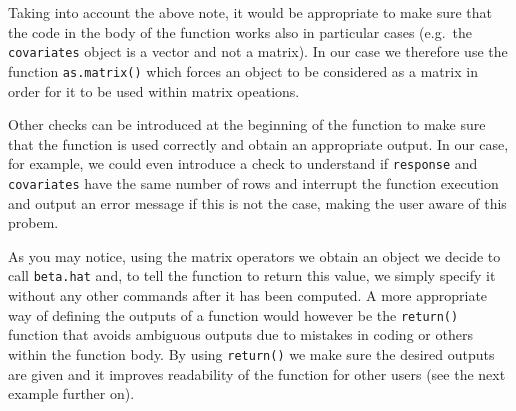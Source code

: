 \documentclass[12pt,]{krantz}
\newenvironment{Shaded}{\begin{snugshade}}{\end{snugshade}}
\newcommand{\KeywordTok}[1]{\textcolor[rgb]{0.27,0.27,0.27}{\textbf{#1}}}
\newcommand{\DecValTok}[1]{\textcolor[rgb]{0.06,0.06,0.06}{#1}}
\newcommand{\StringTok}[1]{\textcolor[rgb]{0.5,0.5,0.5}{#1}}
\newcommand{\CommentTok}[1]{\textcolor[rgb]{0.37,0.37,0.37}{\textit{#1}}}
\newcommand{\ControlFlowTok}[1]{\textcolor[rgb]{0.27,0.27,0.27}{\textbf{#1}}}
\newcommand{\OperatorTok}[1]{\textcolor[rgb]{0.43,0.43,0.43}{\textbf{#1}}}
\newcommand{\NormalTok}[1]{#1}
\let\BeginKnitrBlock\begin \let\EndKnitrBlock\end
\begin{document}
Taking into account the above note, it would be appropriate to make sure
that the code in the body of the function works also in particular cases
(e.g.~the \texttt{covariates} object is a vector and not a matrix). In
our case we therefore use the function \texttt{as.matrix()} which forces
an object to be considered as a matrix in order for it to be used within
matrix opeations.

\begin{Shaded}
\end{Shaded}

\BeginKnitrBlock{rmdtip}
Other checks can be introduced at the beginning of the function to make
sure that the function is used correctly and obtain an appropriate
output. In our case, for example, we could even introduce a check to
understand if \texttt{response} and \texttt{covariates} have the same
number of rows and interrupt the function execution and output an error
message if this is not the case, making the user aware of this probem.
\EndKnitrBlock{rmdtip}

As you may notice, using the matrix operators we obtain an object we
decide to call \texttt{beta.hat} and, to tell the function to return
this value, we simply specify it without any other commands after it has
been computed. A more appropriate way of defining the outputs of a
function would however be the \texttt{return()} function that avoids
ambiguous outputs due to mistakes in coding or others within the
function body. By using \texttt{return()} we make sure the desired
outputs are given and it improves readability of the function for other
users (see the next example further on).
\end{document}
